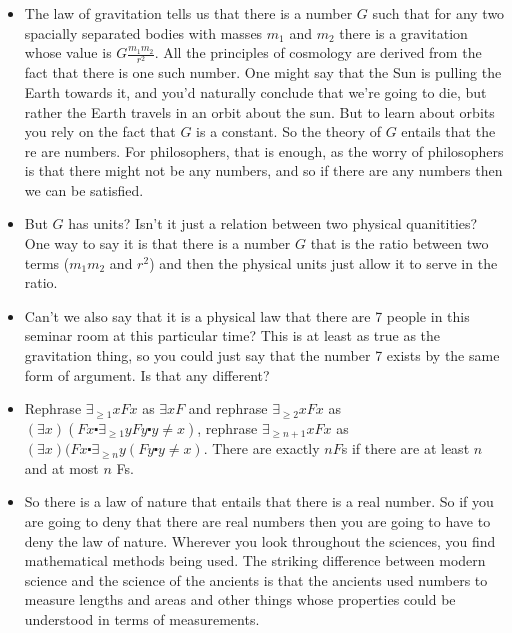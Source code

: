 \documentclass[12pt]{article}
\theoremstyle{definition}
\begin{document}
\begin{itemize}
    \itemsep0em 
    \item
        The law of gravitation tells us that there is a number $G$ such that
        for any two spacially separated bodies with masses $m_1$ and $m_2$
        there is a gravitation whose value is $G\frac{m_1m_2}{r^2}$. All the
        principles of cosmology are derived from the fact that there is one
        such number. One might say that the Sun is pulling the Earth towards
        it, and you'd naturally conclude that we're going to die, but rather
        the Earth travels in an orbit about the sun. But to learn about orbits
        you rely on the fact that $G$ is a constant. So the theory of $G$
        entails that the re are numbers. For philosophers, that is enough, as
        the worry of philosophers is that there might not be any numbers, and
        so if there are any numbers then we can be satisfied. 
    \item
        But $G$ has units? Isn't it just a relation between two physical
        quanitities? One way to say it is that there is a number $G$ that is
        the ratio between two terms ($m_1m_2$ and $r^2$) and then the physical
        units just allow it to serve in the ratio.
	\item
        Can't we also say that it is a physical law that there are 7 people in
        this seminar room at this particular time? This is at least as true as
        the gravitation thing, so you could just say that the number 7 exists
        by the same form of argument. Is that any different?
    \item
        Rephrase $\exists_{\ge 1} xFx$ as $\exists x F$ and rephrase
        $\exists_{\ge 2} x Fx$ as $(\exists x)(Fx \centerdot \exists_{\ge 1} y
        Fy \centerdot y \ne x)$, rephrase $\exists_{\ge n + 1} xFx$ as
        $(\exists x)(Fx \centerdot \exists_{\ge n} y (Fy \centerdot y \ne x)$.
        There are exactly $n F$s if there are at least $n$ and at most $n$ Fs.
    \item
        So there is a law of nature that entails that there is a real number.
        So if you are going to deny that there are real numbers then you are
        going to have to deny the law of nature. Wherever you look throughout
        the sciences, you find mathematical methods being used. The striking
        difference between modern science and the science of the ancients is
        that the ancients used numbers to measure lengths and areas and other
        things whose properties could be understood in terms of measurements.

\end{itemize}
\end{document}
